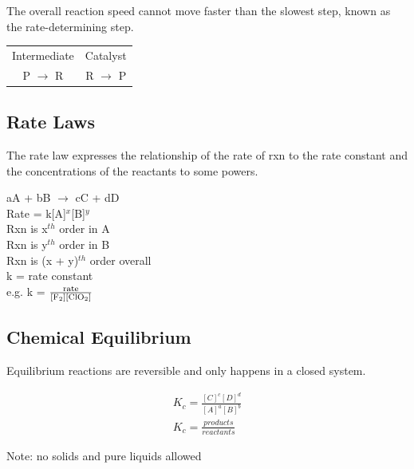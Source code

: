 \documentclass[11pt]{article}
\begin{document}
    The overall reaction speed cannot move faster than the slowest step, known as the rate-determining step.

    \begin{center}
        \begin{tabular}{c c}
            Intermediate & Catalyst \\
            P $\rightarrow$ R & R $\rightarrow$ P
        \end{tabular}
    \end{center}

    \subsection{Rate Laws}
    The rate law expresses the relationship of the rate of rxn to the rate constant and the concentrations of the reactants to some powers.

    \begin{center}
        aA + bB $\rightarrow$ cC + dD \\
        Rate = k[A]$^{x}$[B]$^{y}$ \\
        Rxn is x$^{th}$ order in A \\
        Rxn is y$^{th}$ order in B \\
        Rxn is (x + y)$^{th}$ order overall \\
        \break
        k = rate constant \\
        e.g. k = $\frac{\text{rate}}{[\ce{F2}][\ce{ClO2}]}$
    \end{center}

    \subsection{Chemical Equilibrium}
    Equilibrium reactions are reversible and only happens in a closed system.

    \begin{equation*}
        \begin{gathered}
            K_{c} = \frac{[C]^{c}[D]^{d}}{[A]^{a}[B]^{b}} \\
            K_{c} = \frac{products}{reactants} 
        \end{gathered}
    \end{equation*}

    \begin{center}
        Note: no solids and pure liquids allowed
    \end{center}
\end{document}
